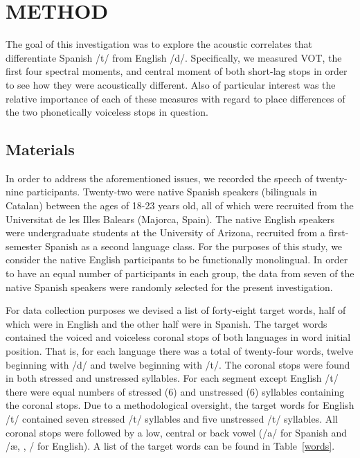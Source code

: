 \documentclass[a4paper,10pt,twocolumn]{article}\usepackage[]{graphicx}\usepackage[]{color}
\begin{document}

\section{METHOD} %
\label{sec:method}

	The goal of this investigation was to explore the acoustic correlates that differentiate Spanish /t/ from English /d/. Specifically, we measured VOT, the first four spectral moments, and central moment of both short-lag stops in order to see how they were acoustically different. Also of particular interest was the relative importance of each of these measures with regard to place differences of the two phonetically voiceless stops in question. 

	\subsection{Materials} %
	\label{sub:materials}
	
	In order to address the aforementioned issues, we recorded the speech of twenty-nine participants. Twenty-two were native Spanish speakers (bilinguals in Catalan) between the ages of 18-23 years old, all of which were recruited from the Universitat de les Illes Balears (Majorca, Spain). The native English speakers were undergraduate students at the University of Arizona, recruited from a first-semester Spanish as a second language class. For the purposes of this study, we consider the native English participants to be functionally monolingual. In order to have an equal number of participants in each group, the data from seven of the native Spanish speakers were randomly selected for the present investigation.

	For data collection purposes we devised a list of forty-eight target words, half of which were in English and the other half were in Spanish. The target words contained the voiced and voiceless coronal stops of both languages in word initial position. That is, for each language there was a total of twenty-four words, twelve beginning with /d/ and twelve beginning with /t/. The coronal stops were found in both stressed and unstressed syllables. For each segment except English /t/ there were equal numbers of stressed (6) and unstressed (6) syllables containing the coronal stops. Due to a methodological oversight, the target words for English /t/ contained seven stressed /t/ syllables and five unstressed /t/ syllables. All coronal stops were followed by a low, central or back vowel (/a/ for Spanish and /\ae, \textscripta, \textrhookschwa/ for English). A list of the target words can be found in Table~\ref{words}. 
\end{document}
